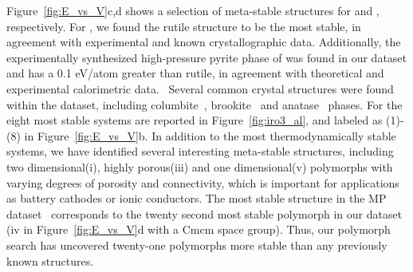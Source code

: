 Figure~\ref{fig:E_vs_V}c,d shows a selection of meta-stable structures for \IrOtwo and \IrOthree, respectively.
%
For \IrOtwo, we found the rutile structure to be the most stable,
in agreement with experimental and known crystallographic data.
%
Additionally, the experimentally synthesized high-pressure pyrite phase of \IrOtwo was found in our dataset and has a \DHf \mytilde\num{0.1} eV/atom greater than rutile, in agreement with theoretical and experimental calorimetric data.~\cite{bolzan1997structural, shirako2014synthesis}
%
%
Several common \ABtwo crystal structures were found within the dataset, including columbite~\cite{columbite}, brookite~\cite{brookite} and anatase~\cite{anatase} phases.
%
For \IrOthree the eight most stable systems are reported in Figure~\ref{fig:iro3_al}, and labeled as (1)-(8) in Figure~\ref{fig:E_vs_V}b.
%
In addition to the most thermodynamically stable systems,
we have identified several interesting meta-stable structures,
including two dimensional(i), highly porous(iii) and one dimensional(v) polymorphs with varying degrees of porosity and connectivity,
which is important for applications as battery cathodes or ionic conductors.\cite{}
%
%
The most stable \IrOthree structure in the MP dataset~\cite{mp-1097041} corresponds to the twenty second most stable \IrOthree polymorph in our dataset
(iv in Figure~\ref{fig:E_vs_V}d with a Cmcm space group).
%
Thus, our polymorph search has uncovered twenty-one \IrOthree polymorphs more stable than any previously known structures.
